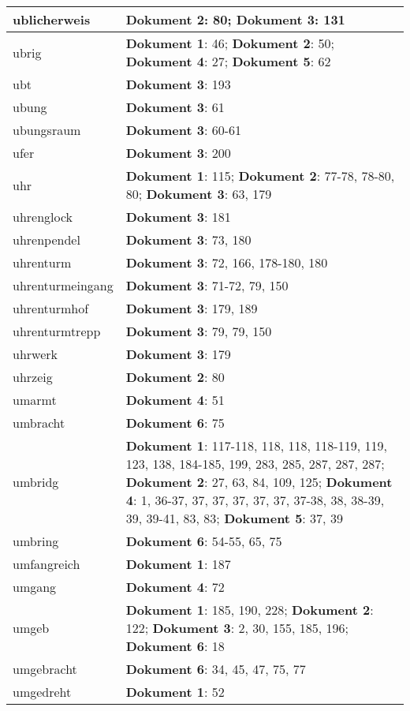 \documentclass[a5paper]{article}
\begin{document}
\begin{longtable}[l]{|l|p{3in}|}
\hline
ublicherweis & \textbf{Dokument 2}: 80; \textbf{Dokument 3}: 131 \\
\hline
ubrig & \textbf{Dokument 1}: 46; \textbf{Dokument 2}: 50; \textbf{Dokument 4}: 27; \textbf{Dokument 5}: 62 \\
\hline
ubt & \textbf{Dokument 3}: 193 \\
\hline
ubung & \textbf{Dokument 3}: 61 \\
\hline
ubungsraum & \textbf{Dokument 3}: 60-61 \\
\hline
ufer & \textbf{Dokument 3}: 200 \\
\hline
uhr & \textbf{Dokument 1}: 115; \textbf{Dokument 2}: 77-78, 78-80, 80; \textbf{Dokument 3}: 63, 179 \\
\hline
uhrenglock & \textbf{Dokument 3}: 181 \\
\hline
uhrenpendel & \textbf{Dokument 3}: 73, 180 \\
\hline
uhrenturm & \textbf{Dokument 3}: 72, 166, 178-180, 180 \\
\hline
uhrenturmeingang & \textbf{Dokument 3}: 71-72, 79, 150 \\
\hline
uhrenturmhof & \textbf{Dokument 3}: 179, 189 \\
\hline
uhrenturmtrepp & \textbf{Dokument 3}: 79, 79, 150 \\
\hline
uhrwerk & \textbf{Dokument 3}: 179 \\
\hline
uhrzeig & \textbf{Dokument 2}: 80 \\
\hline
umarmt & \textbf{Dokument 4}: 51 \\
\hline
umbracht & \textbf{Dokument 6}: 75 \\
\hline
umbridg & \textbf{Dokument 1}: 117-118, 118, 118, 118-119, 119, 123, 138, 184-185, 199, 283, 285, 287, 287, 287; \textbf{Dokument 2}: 27, 63, 84, 109, 125; \textbf{Dokument 4}: 1, 36-37, 37, 37, 37, 37, 37, 37-38, 38, 38-39, 39, 39-41, 83, 83; \textbf{Dokument 5}: 37, 39 \\
\hline
umbring & \textbf{Dokument 6}: 54-55, 65, 75 \\
\hline
umfangreich & \textbf{Dokument 1}: 187 \\
\hline
umgang & \textbf{Dokument 4}: 72 \\
\hline
umgeb & \textbf{Dokument 1}: 185, 190, 228; \textbf{Dokument 2}: 122; \textbf{Dokument 3}: 2, 30, 155, 185, 196; \textbf{Dokument 6}: 18 \\
\hline
umgebracht & \textbf{Dokument 6}: 34, 45, 47, 75, 77 \\
\hline
umgedreht & \textbf{Dokument 1}: 52 \\

\end{longtable}
\end{document}
